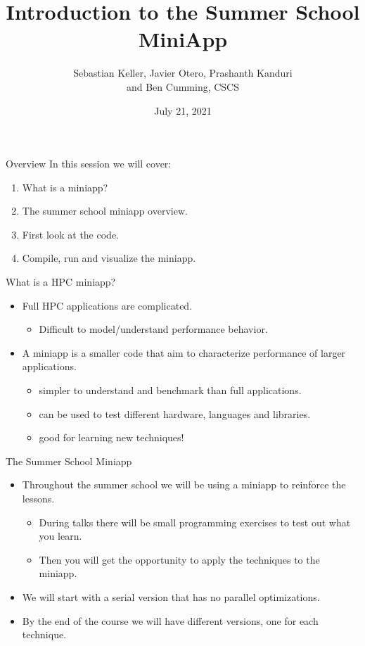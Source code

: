 \documentclass[aspectratio=43]{beamer}
\author{Sebastian Keller, Javier Otero, Prashanth Kanduri\\ and Ben Cumming, CSCS}
\title{Introduction to the Summer School MiniApp}
\subtitle{}
\date{July 21, 2021}
\begin{document}
\cscstitle

\begin{frame}[fragile]{Overview}
    In this session we will cover:
    \begin{enumerate}
        \item What is a miniapp?
        \item The summer school miniapp overview.
        \item First look at the code.
        \item Compile, run and visualize the miniapp.
    \end{enumerate}
\end{frame}

\begin{frame}[fragile]{What is a HPC miniapp?}
    \begin{itemize}
        \item Full HPC applications are complicated.
        \begin{itemize}
            \item Difficult to model/understand performance behavior.
        \end{itemize}
        \item A miniapp is a smaller code that aim to characterize performance of larger applications.
        \begin{itemize}
            \item simpler to understand and benchmark than full applications.
            \item can be used to test different hardware, languages and libraries.
            \item good for learning new techniques!
        \end{itemize}
    \end{itemize}
\end{frame}

\begin{frame}[fragile]{The Summer School Miniapp}
    \begin{itemize}
        \item Throughout the summer school we will be using a  miniapp to reinforce the lessons.
        \begin{itemize}
            \item During talks there will be small programming exercises to  test out what you learn.
            \item Then you will get the opportunity to apply the techniques  to the miniapp.
        \end{itemize}
        \item We will start with a serial version that has no parallel  optimizations.
        \item By the end of the course we will have different  versions, one for each technique.
    \end{itemize}
\end{frame}
\end{document}
